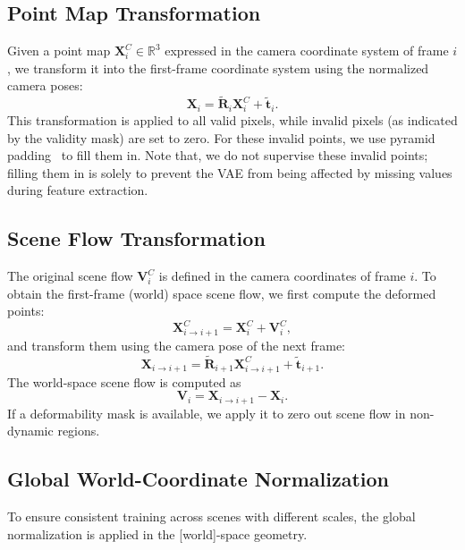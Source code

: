 \subsection{Point Map Transformation}

Given a point map $\bm{X}_i^C \in \mathbb{R}^3$ expressed in the camera coordinate system of frame $i$, we transform it into the first-frame coordinate system using the normalized camera poses:
\begin{equation}
\bm{X}_i = \tilde{\bm{R}}_i \bm{X}_i^C + \tilde{\bm{t}}_i .
\end{equation}
This transformation is applied to all valid pixels, while invalid pixels (as indicated by the validity mask) are set to zero. 
For these invalid points, we use pyramid padding~\cite{zhang2024layerdiffuse} to fill them in.
Note that,
we do not supervise these invalid points; filling them in is solely to prevent the VAE from being affected by missing values during feature extraction.

\subsection{Scene Flow Transformation}

The original scene flow $ \bm{V}_i^C$ is defined in the camera coordinates of frame $i$. To obtain the first-frame (world) space scene flow, we first compute the deformed points:
\begin{equation}
\bm{X}_{i \rightarrow i+1}^{C} = \bm{X}_i^C + \bm{V}_i^C,
\end{equation}
and transform them using the camera pose of the next frame:
\begin{equation}
\bm{X}_{i \rightarrow i+1} = 
\tilde{\bm{R}}_{i+1} \bm{X}_{i \rightarrow i+1}^{C} + \tilde{\bm{t}}_{i+1}.
\end{equation}
The world-space scene flow is computed as
\begin{equation}
\bm{V}_i = \bm{X}_{i \rightarrow i+1} - \bm{X}_i .
\end{equation}
If a deformability mask is available, we apply it to zero out scene flow in non-dynamic regions.


\subsection{Global World-Coordinate Normalization}

To ensure consistent training across scenes with different scales,
the global normalization is applied in the [world]-space geometry.

